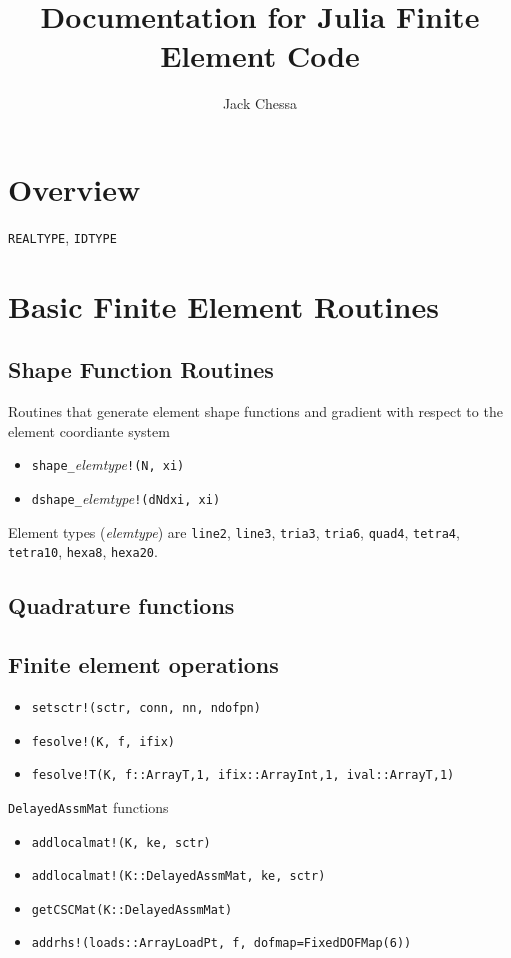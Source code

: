 \documentclass[11pt]{article} %
\title{Documentation for Julia Finite Element Code}
\author{Jack Chessa}
\begin{document}
\maketitle

\section{Overview}


\texttt{REALTYPE},  \texttt{IDTYPE}

\section{Basic Finite Element Routines}
\subsection{Shape Function Routines}
Routines that generate element shape functions and gradient with respect to the element coordiante system
\begin{itemize}
\item \texttt{shape\_}\textit{elemtype}\texttt{!(N, xi)}
\item \texttt{dshape\_}\textit{elemtype}\texttt{!(dNdxi, xi)}
\end{itemize}
Element types (\textit{elemtype}) are \texttt{line2}, \texttt{line3}, \texttt{tria3}, \texttt{tria6}, \texttt{quad4}, \texttt{tetra4},   \texttt{tetra10}, \texttt{hexa8}, \texttt{hexa20}.

\subsection{Quadrature functions}

\subsection{Finite element operations}
\begin{itemize}
\item \texttt{setsctr!(sctr, conn, nn, ndofpn)}
\item \texttt{fesolve!(K, f, ifix)}
\item \texttt{fesolve!{T}(K, f::Array{T,1}, ifix::Array{Int,1}, ival::Array{T,1})}
\end{itemize}

\texttt{DelayedAssmMat} functions
\begin{itemize}
\item \texttt{addlocalmat!(K, ke, sctr)}
\item \texttt{addlocalmat!(K::DelayedAssmMat, ke, sctr)}
\item \texttt{getCSCMat(K::DelayedAssmMat)}
\end{itemize}


\begin{itemize}
\item \texttt{addrhs!(loads::Array{LoadPt}, f, dofmap=FixedDOFMap(6))}
\end{itemize}
\end{document}
